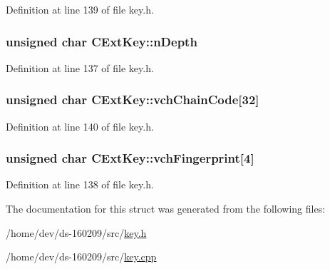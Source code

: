 Definition at line 139 of file key.\+h.

\hypertarget{struct_c_ext_key_ab197a253f41646975405b4ead8027b55}{}
\subsubsection[{n\+Depth}]{\setlength{\rightskip}{0pt plus 5cm}unsigned char C\+Ext\+Key\+::n\+Depth}\label{struct_c_ext_key_ab197a253f41646975405b4ead8027b55}


Definition at line 137 of file key.\+h.

\hypertarget{struct_c_ext_key_a637ce75955e2883d20172b707c26a459}{}
\subsubsection[{vch\+Chain\+Code}]{\setlength{\rightskip}{0pt plus 5cm}unsigned char C\+Ext\+Key\+::vch\+Chain\+Code\mbox{[}32\mbox{]}}\label{struct_c_ext_key_a637ce75955e2883d20172b707c26a459}


Definition at line 140 of file key.\+h.

\hypertarget{struct_c_ext_key_a22efb3f5dfb26cd8d88d2ab5db885978}{}
\subsubsection[{vch\+Fingerprint}]{\setlength{\rightskip}{0pt plus 5cm}unsigned char C\+Ext\+Key\+::vch\+Fingerprint\mbox{[}4\mbox{]}}\label{struct_c_ext_key_a22efb3f5dfb26cd8d88d2ab5db885978}


Definition at line 138 of file key.\+h.



The documentation for this struct was generated from the following files\+:\begin{DoxyCompactItemize}
\item 
/home/dev/ds-\/160209/src/\hyperlink{key_8h}{key.\+h}\item 
/home/dev/ds-\/160209/src/\hyperlink{key_8cpp}{key.\+cpp}\end{DoxyCompactItemize}
